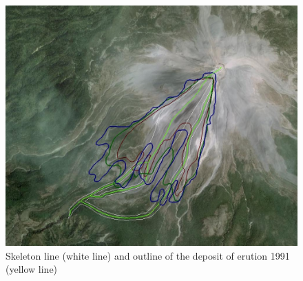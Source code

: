 \documentclass[letterpaper,10pt]{article}
\begin{document}
 \begin{figure}[H]
 \centerline{\includegraphics[scale=0.5]{IMAGES/comparison1.jpg}}
 \caption{Skeleton line (white line) and outline of the deposit of erution 1991 (yellow line)}
 \label{compfig}
 \end{figure}
\end{document}
